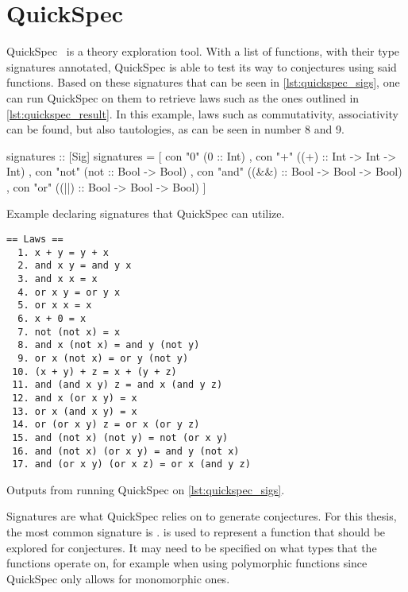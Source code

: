 \section{QuickSpec}\label{sec:quickspec}
QuickSpec~\autocite{Quickspec} is a theory exploration tool.
With a list of functions, with their type signatures annotated, QuickSpec is able to test its way to conjectures using said functions.
Based on these signatures that can be seen in \cref{lst:quickspec_sigs}, one can run QuickSpec on them to retrieve laws such as the ones outlined in \cref{lst:quickspec_result}.
In this example, laws such as commutativity, associativity can be found, but also tautologies, as can be seen in number 8 and 9.

\begin{listing}[H]
\begin{HaskellCode}
signatures :: [Sig]
signatures =
  [ con "0" (0 :: Int)
  , con "+" ((+) :: Int -> Int -> Int)
  , con "not" (not :: Bool -> Bool)
  , con "and" ((&&) :: Bool -> Bool -> Bool)
  , con "or" ((||) :: Bool -> Bool -> Bool)
  ]
\end{HaskellCode}
\caption{Example declaring signatures that QuickSpec can utilize.}
\label{lst:quickspec_sigs}
\end{listing}

\begin{listing}[ht]
\begin{verbatim}
== Laws ==
  1. x + y = y + x
  2. and x y = and y x
  3. and x x = x
  4. or x y = or y x
  5. or x x = x
  6. x + 0 = x
  7. not (not x) = x
  8. and x (not x) = and y (not y)
  9. or x (not x) = or y (not y)
 10. (x + y) + z = x + (y + z)
 11. and (and x y) z = and x (and y z)
 12. and x (or x y) = x
 13. or x (and x y) = x
 14. or (or x y) z = or x (or y z)
 15. and (not x) (not y) = not (or x y)
 16. and (not x) (or x y) = and y (not x)
 17. and (or x y) (or x z) = or x (and y z)
\end{verbatim}
\caption{Outputs from running QuickSpec on \cref{lst:quickspec_sigs}.}
\label{lst:quickspec_result}
\end{listing}

Signatures are what QuickSpec relies on to generate conjectures.
For this thesis, the most common signature is .
 is used to represent a function that should be explored for conjectures.
It may need to be specified on what types that the functions operate on, for example when using polymorphic functions since QuickSpec only allows for monomorphic ones.


